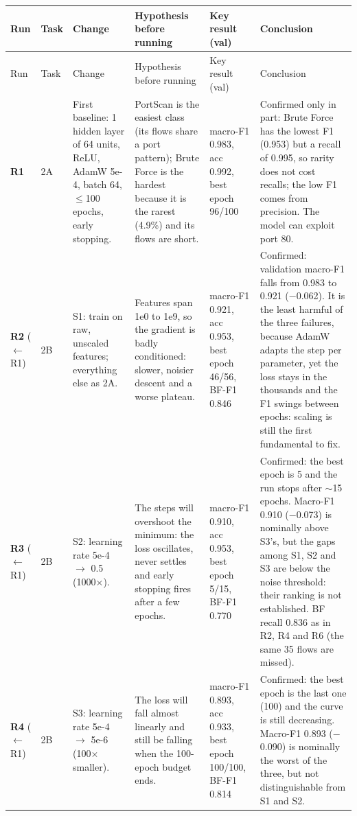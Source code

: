 \documentclass[9pt]{extarticle}
\renewcommand{\arraystretch}{0.95}
\begin{document}
{\scriptsize
\setlength{\tabcolsep}{3pt}
\renewcommand{\arraystretch}{1.15}
\begin{longtable}{@{}>{\raggedright\arraybackslash}p{1.3cm}>{\raggedright\arraybackslash}p{0.75cm}>{\raggedright\arraybackslash}p{3.0cm}>{\raggedright\arraybackslash}p{3.3cm}>{\raggedright\arraybackslash}p{2.4cm}>{\raggedright\arraybackslash}p{3.8cm}@{}}
\toprule
Run & Task & Change & Hypothesis before running & Key result (val) & Conclusion\\
\midrule
\endfirsthead
\toprule
Run & Task & Change & Hypothesis before running & Key result (val) & Conclusion\\
\midrule
\endhead
\bottomrule
\endfoot
\textbf{R1} & 2A & First baseline: 1 hidden layer of 64 units, ReLU, AdamW 5e-4, batch 64, $\le$100 epochs, early stopping. & PortScan is the easiest class (its flows share a port pattern); Brute Force is the hardest because it is the rarest (4.9\%) and its flows are short. & macro-F1 0.983, acc 0.992, best epoch 96/100 & Confirmed only in part: Brute Force has the lowest F1 (0.953) but a recall of 0.995, so rarity does not cost recalls; the low F1 comes from precision. The model can exploit port 80.\\
\textbf{R2} ($\leftarrow$R1) & 2B & S1: train on raw, unscaled features; everything else as 2A. & Features span 1e0 to 1e9, so the gradient is badly conditioned: slower, noisier descent and a worse plateau. & macro-F1 0.921, acc 0.953, best epoch 46/56, BF-F1 0.846 & Confirmed: validation macro-F1 falls from 0.983 to 0.921 ($-$0.062). It is the least harmful of the three failures, because AdamW adapts the step per parameter, yet the loss stays in the thousands and the F1 swings between epochs: scaling is still the first fundamental to fix.\\
\textbf{R3} ($\leftarrow$R1) & 2B & S2: learning rate 5e-4 $\rightarrow$ 0.5 (1000$\times$). & The steps will overshoot the minimum: the loss oscillates, never settles and early stopping fires after a few epochs. & macro-F1 0.910, acc 0.953, best epoch 5/15, BF-F1 0.770 & Confirmed: the best epoch is 5 and the run stops after $\sim$15 epochs. Macro-F1 0.910 ($-$0.073) is nominally above S3's, but the gaps among S1, S2 and S3 are below the noise threshold: their ranking is not established. BF recall 0.836 as in R2, R4 and R6 (the same 35 flows are missed).\\
\textbf{R4} ($\leftarrow$R1) & 2B & S3: learning rate 5e-4 $\rightarrow$ 5e-6 (100$\times$ smaller). & The loss will fall almost linearly and still be falling when the 100-epoch budget ends. & macro-F1 0.893, acc 0.933, best epoch 100/100, BF-F1 0.814 & Confirmed: the best epoch is the last one (100) and the curve is still decreasing. Macro-F1 0.893 ($-$0.090) is nominally the worst of the three, but not distinguishable from S1 and S2.\\

\end{longtable}}
\end{document}
